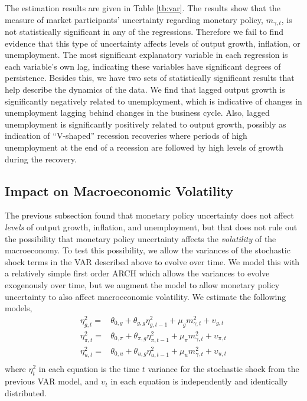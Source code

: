 \documentclass[12pt]{article}
\newcommand{\beq}{\begin{equation}}
\newcommand{\eeq}{\end{equation}}
\begin{document}
The estimation results are given in Table \ref{tb:var}.  The results show that the measure of market participants' uncertainty regarding monetary policy, $m_{\gamma,t}$, is not statistically significant in any of the regressions.   Therefore we fail to find evidence that this type of uncertainty affects levels of output growth, inflation, or unemployment.  The most significant explanatory variable in each regression is each variable's own lag, indicating these variables have significant degrees of persistence.  Besides this, we have two sets of statistically significant results that help describe the dynamics of the data.  We find that lagged output growth is significantly negatively related to unemployment, which is indicative of changes in unemployment lagging behind changes in the business cycle.  Also, lagged unemployment is significantly positively related to output growth, possibly as indication of ``V-shaped'' recession recoveries where periods of high unemployment at the end of a recession are followed by high levels of growth during the recovery.

\subsection{Impact on Macroeconomic Volatility}
The previous subsection found that monetary policy uncertainty does not affect \textit{levels} of output growth, inflation, and unemployment, but that does not rule out the possibility that monetary policy uncertainty affects the \textit{volatility} of the macroeconomy.  To test this possibility, we allow the variances of the stochastic shock terms in the VAR described above to evolve over time.  We model this with a relatively simple first order ARCH which allows the variances to evolve exogenously over time, but we augment the model to allow monetary policy uncertainty to also affect macroeconomic volatility.  We estimate the following models,
\beq \label{eq:arch} \begin{array}{cc}
\eta_{g,t}^2 = & \theta_{0,g} + \theta_{g,g} \eta_{g,t-1}^2 + \mu_g m_{\gamma,t}^2 + \upsilon_{g,t} \\ [0.5pc]
\eta_{\pi,t}^2 = & \theta_{0,\pi} + \theta_{\pi,g} \eta_{\pi,t-1}^2 + \mu_\pi m_{\gamma,t}^2 + \upsilon_{\pi,t} \\ [0.5pc]
\eta_{u,t}^2 = & \theta_{0,u} + \theta_{u,g} \eta_{u,t-1}^2 + \mu_u m_{\gamma,t}^2 + \upsilon_{u,t} \\ 
\end{array}
\eeq
where $\eta_t^2$ in each equation is the time $t$ variance for the stochastic shock from the previous VAR model, and $\upsilon_{t}$ in each equation is independently and identically distributed.  
\end{document}
